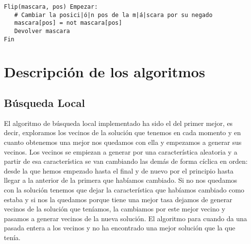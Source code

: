 \documentclass[12pt]{article}
\begin{document}
\begin{lstlisting}
Flip(mascara, pos) Empezar:
   # Cambiar la posici|ó|n pos de la m|á|scara por su negado 
   mascara[pos] = not mascara[pos]
   Devolver mascara
Fin
\end{lstlisting}

\newpage

\section{Descripción de los algoritmos}

\subsection{Búsqueda Local}
El algoritmo de búsqueda local implementado ha sido el del primer mejor, es decir, exploramos los vecinos de la solución que tenemos en cada momento y en cuanto obtenemos una mejor nos quedamos con ella y empezamos a generar sus vecinos. Los vecinos se empiezan a generar por una característica aleatoria y a partir de esa característica se van cambiando las demás de forma cíclica en orden: desde la que hemos empezado hasta el final y de nuevo por el principio hasta llegar a la anterior de la primera que habíamos cambiado. Si no nos quedamos con la solución tenemos que dejar la característica que habíamos cambiado como estaba y si nos la quedamos porque tiene una mejor tasa dejamos de generar vecinos de la solución que teníamos, la cambiamos por este mejor vecino y pasamos a generar vecinos de la nueva solución. El algoritmo para cuando da una pasada entera a los vecinos y no ha encontrado una mejor solución que la que tenía.\\
\end{document}
